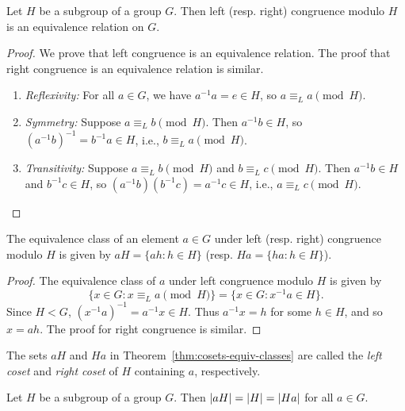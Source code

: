 \begin{theorem}
    Let \(H\) be a subgroup of a group \(G\). Then left (resp. right) congruence modulo \(H\) is an equivalence relation on \(G\).
\end{theorem}

\begin{proof}
    We prove that left congruence is an equivalence relation. The proof that right congruence is an equivalence relation is similar.

    \begin{enumerate}
        \item \emph{Reflexivity:} For all \(a \in G\), we have \(a^{-1}a = e \in H\), so \(a \equiv_L a \pmod{H}\).
        \item \emph{Symmetry:} Suppose \(a \equiv_L b \pmod{H}\). Then \(a^{-1}b \in H\), so \((a^{-1}b)^{-1} = b^{-1}a \in H\), i.e., \(b \equiv_L a \pmod{H}\).
        \item \emph{Transitivity:} Suppose \(a \equiv_L b \pmod{H}\) and \(b \equiv_L c \pmod{H}\). Then \(a^{-1}b \in H\) and \(b^{-1}c \in H\), so \((a^{-1}b)(b^{-1}c) = a^{-1}c \in H\), i.e., \(a \equiv_L c \pmod{H}\).
    \end{enumerate}
\end{proof}

\begin{theorem}
    \label{thm:cosets-equiv-classes}
    The equivalence class of an element \(a \in G\) under left (resp. right) congruence modulo \(H\) is given by \(aH = \{ah : h \in H\}\) (resp. \(Ha = \{ha : h \in H\}\)).
\end{theorem}

\begin{proof}
    The equivalence class of \(a\) under left congruence modulo \(H\) is given by
    \[
        \{ x \in G : x \equiv_L a \pmod{H} \} = \{ x \in G : x^{-1}a \in H \}.
    \]
    Since \(H < G\), \((x^{-1}a)^{-1} = a^{-1}x \in H\). Thus \(a^{-1}x = h\) for some \(h \in H\), and so \(x = ah\). The proof for right congruence is similar.
\end{proof}

\begin{definition}
    The sets \(aH\) and \(Ha\) in Theorem~\ref{thm:cosets-equiv-classes} are called the \emph{left coset} and \emph{right coset} of \(H\) containing \(a\), respectively.
\end{definition}

\begin{theorem}
    Let \(H\) be a subgroup of a group \(G\). Then \(\lvert aH \rvert = \lvert H \rvert = \lvert Ha \rvert\) for all \(a \in G\).
\end{theorem}

